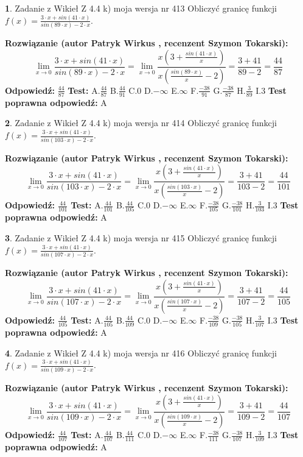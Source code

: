 \documentclass[12pt, a4paper]{article}
\theoremstyle{definition} %
\newtheorem{zad}{}
\newcommand{\zadStart}[1]{\begin{zad}#1\newline}
\newcommand{\zadStop}{\end{zad}}
\newcommand{\rozwStart}[2]{\noindent \textbf{Rozwiązanie (autor #1 , recenzent #2): }\newline}
\newcommand{\rozwStop}{\newline}
\newcommand{\odpStart}{\noindent \textbf{Odpowiedź:}\newline}
\newcommand{\odpStop}{\newline}
\newcommand{\testStart}{\noindent \textbf{Test:}\newline}
\newcommand{\testStop}{\newline}
\newcommand{\kluczStart}{\noindent \textbf{Test poprawna odpowiedź:}\newline}
\newcommand{\kluczStop}{\newline}
\begin{document}
\zadStart{Zadanie z Wikieł Z 4.4 k) moja wersja nr 413}
Obliczyć granicę funkcji $f(x)=\frac{3\cdot x +sin(41\cdot x)}{sin(89\cdot x) -2\cdot x}$.
\zadStop
\rozwStart{Patryk Wirkus}{Szymon Tokarski}
$$\lim\limits_{x\to 0}\frac{3\cdot x +sin(41\cdot x)}{sin(89\cdot x) -2\cdot x}
=\lim\limits_{x\to 0}\frac{x(3+\frac{sin(41\cdot x)}{x})}{x(\frac{sin(89\cdot x)}{x}-2)}
=\frac{3+41}{89-2} = \frac{44}{87}$$
\rozwStop
\odpStart
$\frac{44}{87}$
\odpStop
\testStart
A.$\frac{44}{87}$
B.$\frac{44}{91}$
C.$0$
D.$-\infty$
E.$\infty$
F.$\frac{-38}{91}$
G.$\frac{-38}{87}$
H.$\frac{3}{89}$
I.$3$
\testStop
\kluczStart
A
\kluczStop



\zadStart{Zadanie z Wikieł Z 4.4 k) moja wersja nr 414}
Obliczyć granicę funkcji $f(x)=\frac{3\cdot x +sin(41\cdot x)}{sin(103\cdot x) -2\cdot x}$.
\zadStop
\rozwStart{Patryk Wirkus}{Szymon Tokarski}
$$\lim\limits_{x\to 0}\frac{3\cdot x +sin(41\cdot x)}{sin(103\cdot x) -2\cdot x}
=\lim\limits_{x\to 0}\frac{x(3+\frac{sin(41\cdot x)}{x})}{x(\frac{sin(103\cdot x)}{x}-2)}
=\frac{3+41}{103-2} = \frac{44}{101}$$
\rozwStop
\odpStart
$\frac{44}{101}$
\odpStop
\testStart
A.$\frac{44}{101}$
B.$\frac{44}{105}$
C.$0$
D.$-\infty$
E.$\infty$
F.$\frac{-38}{105}$
G.$\frac{-38}{101}$
H.$\frac{3}{103}$
I.$3$
\testStop
\kluczStart
A
\kluczStop



\zadStart{Zadanie z Wikieł Z 4.4 k) moja wersja nr 415}
Obliczyć granicę funkcji $f(x)=\frac{3\cdot x +sin(41\cdot x)}{sin(107\cdot x) -2\cdot x}$.
\zadStop
\rozwStart{Patryk Wirkus}{Szymon Tokarski}
$$\lim\limits_{x\to 0}\frac{3\cdot x +sin(41\cdot x)}{sin(107\cdot x) -2\cdot x}
=\lim\limits_{x\to 0}\frac{x(3+\frac{sin(41\cdot x)}{x})}{x(\frac{sin(107\cdot x)}{x}-2)}
=\frac{3+41}{107-2} = \frac{44}{105}$$
\rozwStop
\odpStart
$\frac{44}{105}$
\odpStop
\testStart
A.$\frac{44}{105}$
B.$\frac{44}{109}$
C.$0$
D.$-\infty$
E.$\infty$
F.$\frac{-38}{109}$
G.$\frac{-38}{105}$
H.$\frac{3}{107}$
I.$3$
\testStop
\kluczStart
A
\kluczStop



\zadStart{Zadanie z Wikieł Z 4.4 k) moja wersja nr 416}
Obliczyć granicę funkcji $f(x)=\frac{3\cdot x +sin(41\cdot x)}{sin(109\cdot x) -2\cdot x}$.
\zadStop
\rozwStart{Patryk Wirkus}{Szymon Tokarski}
$$\lim\limits_{x\to 0}\frac{3\cdot x +sin(41\cdot x)}{sin(109\cdot x) -2\cdot x}
=\lim\limits_{x\to 0}\frac{x(3+\frac{sin(41\cdot x)}{x})}{x(\frac{sin(109\cdot x)}{x}-2)}
=\frac{3+41}{109-2} = \frac{44}{107}$$
\rozwStop
\odpStart
$\frac{44}{107}$
\odpStop
\testStart
A.$\frac{44}{107}$
B.$\frac{44}{111}$
C.$0$
D.$-\infty$
E.$\infty$
F.$\frac{-38}{111}$
G.$\frac{-38}{107}$
H.$\frac{3}{109}$
I.$3$
\testStop
\kluczStart
A
\kluczStop
\end{document}
